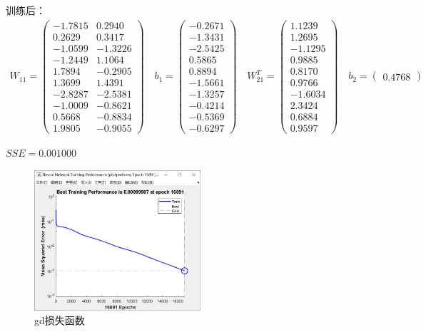 \documentclass[UTF8]{article}
\begin{document}
训练后：
\begin{equation}
\nonumber
\begin{aligned}
W_{11} = 
\left(
\begin{matrix}
    -1.7815 & 0.2940\\
    0.2629 & 0.3417\\
   -1.0599 & -1.3226\\
   -1.2449 & 1.1064\\
    1.7894 & -0.2905\\
    1.3699 & 1.4391\\
   -2.8287 & -2.5381\\
   -1.0009 & -0.8621\\
    0.5668 & -0.8834\\
    1.9805 & -0.9055
\end{matrix}
\right)
\quad
b_{1} = 
\left(
\begin{matrix}
    -0.2671\\
   -1.3431\\
   -2.5425\\
    0.5865\\
    0.8894\\
   -1.5661\\
   -1.3257\\
   -0.4214\\
   -0.5369\\
   -0.6297
\end{matrix}
\right)
\quad
W_{21}^T = 
\left(
\begin{matrix}
    1.1239\\1.2695\\ -1.1295 \\ 0.9885 \\ 0.8170 \\ 0.9766\\ -1.6034\\ 2.3424 \\ 0.6884 \\  0.9597
\end{matrix}
\right)
\quad
b_{2} = 
\left(
\begin{matrix}
    0.4768
\end{matrix}
\right)
\end{aligned}
\end{equation}
\begin{center}
$SSE = 0.001000$
\end{center}
\begin{figure}[H]
\centering
    \includegraphics[width=0.55\textwidth]{gd.jpg}
    \caption[0.3\textwidth]{gd损失函数}
\end{figure}
\end{document}
